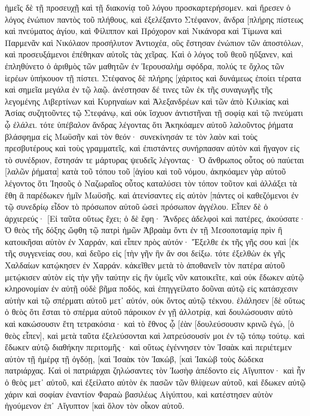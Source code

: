 ἡμεῖς δὲ τῇ προσευχῇ καὶ τῇ διακονίᾳ τοῦ λόγου προσκαρτερήσομεν. 
καὶ ἤρεσεν ὁ λόγος ἐνώπιον παντὸς τοῦ πλήθους, καὶ ἐξελέξαντο Στέφανον, ἄνδρα [πλήρης πίστεως καὶ πνεύματος ἁγίου, καὶ Φίλιππον καὶ Πρόχορον καὶ Νικάνορα καὶ Τίμωνα καὶ Παρμενᾶν καὶ Νικόλαον προσήλυτον Ἀντιοχέα, 
οὓς ἔστησαν ἐνώπιον τῶν ἀποστόλων, καὶ προσευξάμενοι ἐπέθηκαν αὐτοῖς τὰς χεῖρας. 
Καὶ ὁ λόγος τοῦ θεοῦ ηὔξανεν, καὶ ἐπληθύνετο ὁ ἀριθμὸς τῶν μαθητῶν ἐν Ἰερουσαλὴμ σφόδρα, πολύς τε ὄχλος τῶν ἱερέων ὑπήκουον τῇ πίστει. 
Στέφανος δὲ πλήρης [χάριτος καὶ δυνάμεως ἐποίει τέρατα καὶ σημεῖα μεγάλα ἐν τῷ λαῷ. 
ἀνέστησαν δέ τινες τῶν ἐκ τῆς συναγωγῆς τῆς λεγομένης Λιβερτίνων καὶ Κυρηναίων καὶ Ἀλεξανδρέων καὶ τῶν ἀπὸ Κιλικίας καὶ Ἀσίας συζητοῦντες τῷ Στεφάνῳ, 
καὶ οὐκ ἴσχυον ἀντιστῆναι τῇ σοφίᾳ καὶ τῷ πνεύματι ᾧ ἐλάλει. 
τότε ὑπέβαλον ἄνδρας λέγοντας ὅτι Ἀκηκόαμεν αὐτοῦ λαλοῦντος ῥήματα βλάσφημα εἰς Μωϋσῆν καὶ τὸν θεόν· 
συνεκίνησάν τε τὸν λαὸν καὶ τοὺς πρεσβυτέρους καὶ τοὺς γραμματεῖς, καὶ ἐπιστάντες συνήρπασαν αὐτὸν καὶ ἤγαγον εἰς τὸ συνέδριον, 
ἔστησάν τε μάρτυρας ψευδεῖς λέγοντας· Ὁ ἄνθρωπος οὗτος οὐ παύεται [λαλῶν ῥήματα] κατὰ τοῦ τόπου τοῦ [ἁγίου καὶ τοῦ νόμου, 
ἀκηκόαμεν γὰρ αὐτοῦ λέγοντος ὅτι Ἰησοῦς ὁ Ναζωραῖος οὗτος καταλύσει τὸν τόπον τοῦτον καὶ ἀλλάξει τὰ ἔθη ἃ παρέδωκεν ἡμῖν Μωϋσῆς. 
καὶ ἀτενίσαντες εἰς αὐτὸν [πάντες οἱ καθεζόμενοι ἐν τῷ συνεδρίῳ εἶδον τὸ πρόσωπον αὐτοῦ ὡσεὶ πρόσωπον ἀγγέλου. 
Εἶπεν δὲ ὁ ἀρχιερεύς· [Εἰ ταῦτα οὕτως ἔχει; 
ὁ δὲ ἔφη· Ἄνδρες ἀδελφοὶ καὶ πατέρες, ἀκούσατε· Ὁ θεὸς τῆς δόξης ὤφθη τῷ πατρὶ ἡμῶν Ἀβραὰμ ὄντι ἐν τῇ Μεσοποταμίᾳ πρὶν ἢ κατοικῆσαι αὐτὸν ἐν Χαρράν, 
καὶ εἶπεν πρὸς αὐτόν· Ἔξελθε ἐκ τῆς γῆς σου καὶ [ἐκ τῆς συγγενείας σου, καὶ δεῦρο εἰς [τὴν γῆν ἣν ἄν σοι δείξω. 
τότε ἐξελθὼν ἐκ γῆς Χαλδαίων κατῴκησεν ἐν Χαρράν. κἀκεῖθεν μετὰ τὸ ἀποθανεῖν τὸν πατέρα αὐτοῦ μετῴκισεν αὐτὸν εἰς τὴν γῆν ταύτην εἰς ἣν ὑμεῖς νῦν κατοικεῖτε, 
καὶ οὐκ ἔδωκεν αὐτῷ κληρονομίαν ἐν αὐτῇ οὐδὲ βῆμα ποδός, καὶ ἐπηγγείλατο δοῦναι αὐτῷ εἰς κατάσχεσιν αὐτὴν καὶ τῷ σπέρματι αὐτοῦ μετ᾽ αὐτόν, οὐκ ὄντος αὐτῷ τέκνου. 
ἐλάλησεν [δὲ οὕτως ὁ θεὸς ὅτι ἔσται τὸ σπέρμα αὐτοῦ πάροικον ἐν γῇ ἀλλοτρίᾳ, καὶ δουλώσουσιν αὐτὸ καὶ κακώσουσιν ἔτη τετρακόσια· 
καὶ τὸ ἔθνος ᾧ [ἐὰν [δουλεύσουσιν κρινῶ ἐγώ, [ὁ θεὸς εἶπεν], καὶ μετὰ ταῦτα ἐξελεύσονται καὶ λατρεύσουσίν μοι ἐν τῷ τόπῳ τούτῳ. 
καὶ ἔδωκεν αὐτῷ διαθήκην περιτομῆς· καὶ οὕτως ἐγέννησεν τὸν Ἰσαὰκ καὶ περιέτεμεν αὐτὸν τῇ ἡμέρᾳ τῇ ὀγδόῃ, [καὶ Ἰσαὰκ τὸν Ἰακώβ, [καὶ Ἰακὼβ τοὺς δώδεκα πατριάρχας. 
Καὶ οἱ πατριάρχαι ζηλώσαντες τὸν Ἰωσὴφ ἀπέδοντο εἰς Αἴγυπτον· καὶ ἦν ὁ θεὸς μετ᾽ αὐτοῦ, 
καὶ ἐξείλατο αὐτὸν ἐκ πασῶν τῶν θλίψεων αὐτοῦ, καὶ ἔδωκεν αὐτῷ χάριν καὶ σοφίαν ἐναντίον Φαραὼ βασιλέως Αἰγύπτου, καὶ κατέστησεν αὐτὸν ἡγούμενον ἐπ᾽ Αἴγυπτον [καὶ ὅλον τὸν οἶκον αὐτοῦ. 
